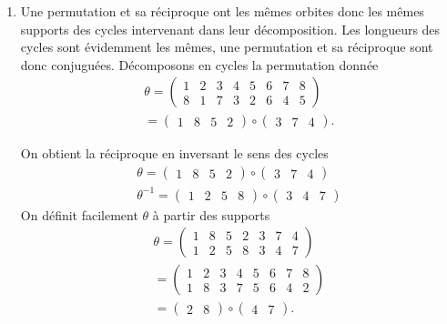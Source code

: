 \begin{enumerate}
  \item Une permutation et sa réciproque ont les mêmes orbites donc les mêmes supports des cycles intervenant dans leur décomposition. Les longueurs des cycles sont évidemment les mêmes, une permutation et sa réciproque sont donc  conjuguées.\newline
  Décomposons en cycles la permutation donnée
\begin{multline*}
\theta =
\begin{pmatrix}
 1 & 2 & 3 & 4 & 5 & 6 & 7 & 8 \\8 & 1 & 7 & 3 & 2 & 6 & 4 & 5 
\end{pmatrix}
\\
=
\begin{pmatrix}
  1 & 8 & 5 & 2
\end{pmatrix}
\circ
\begin{pmatrix}
  3 & 7 & 4
\end{pmatrix}
.
\end{multline*}

On obtient la réciproque en inversant le sens des cycles
\[
\begin{aligned}
  \theta      = \begin{pmatrix} 1 & 8 & 5 & 2 \end{pmatrix} \circ \begin{pmatrix}  3 & 7 & 4 \end{pmatrix} \\
  \theta^{-1} = \begin{pmatrix} 1 & 2 & 5 & 8 \end{pmatrix} \circ \begin{pmatrix}  3 & 4 & 7 \end{pmatrix}
\end{aligned}
\]
On définit facilement $\theta$ à partir des supports
\begin{multline*}
\theta =
\begin{pmatrix}
  1 & 8 & 5 & 2 & 3 & 7 & 4 \\
  1 & 2 & 5 & 8 & 3 & 4 & 7
\end{pmatrix}
\\
=
\begin{pmatrix}
  1 & 2 & 3 & 4 & 5 & 6 & 7 & 8 \\
  1 & 8 & 3 & 7 & 5 & 6 & 4 & 2
\end{pmatrix} \\
=
\begin{pmatrix}
  2 & 8
\end{pmatrix}
\circ 
\begin{pmatrix}
  4 & 7
\end{pmatrix}
.
\end{multline*}

\end{enumerate}
